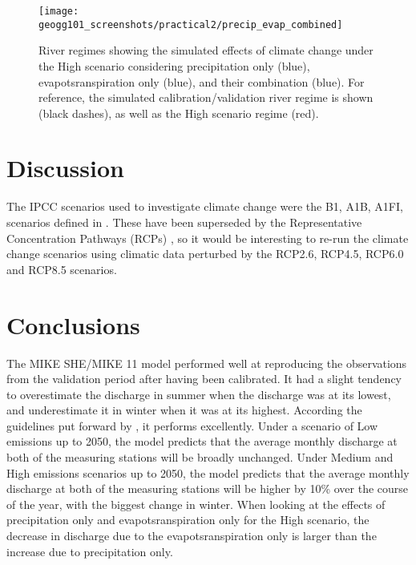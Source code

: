 \documentclass{article}
\begin{document}
\begin{figure}[!h]
    \centering
    \texttt{[image: geogg101\_screenshots/practical2/precip\_evap\_combined]}
    \caption{River regimes showing the simulated effects of climate change under the High scenario considering precipitation only (blue), evapotsranspiration only (blue), and their combination (blue). For reference, the simulated calibration/validation river regime is shown (black dashes), as well as the High scenario regime (red). }
    \label{fig:precip_evap_combined}
\end{figure}

\newpage
\section{Discussion}

The IPCC scenarios used to investigate climate change were the B1, A1B, A1FI, scenarios defined in \textcite{ipcc2000special}. These have been superseded by the Representative Concentration Pathways (RCPs) \parencite{van2011representative}, so it would be interesting to re-run the climate change scenarios using climatic data perturbed by the  RCP2.6, RCP4.5, RCP6.0 and RCP8.5 scenarios.

\section{Conclusions}

The MIKE SHE/MIKE 11 model performed well at reproducing the observations from the validation period after having been calibrated.
It had a slight tendency to overestimate the discharge in summer when the discharge was at its lowest, and underestimate it in winter when it was at its highest.
According the guidelines put forward by \textcite{henriksen2008assessment}, it performs excellently.
Under a scenario of Low emissions up to 2050, the model predicts that the average monthly discharge at both of the measuring stations will be broadly unchanged.
Under Medium and High emissions scenarios up to 2050, the model predicts that the average monthly discharge at both of the measuring stations will be higher by 10\% over the course of the year, with the biggest change in winter.
When looking at the effects of precipitation only and evapotsranspiration only for the High scenario, the decrease in discharge due to the evapotsranspiration only is larger than the increase due to precipitation only. 


\printbibliography[filter=practical2]
\end{document}

